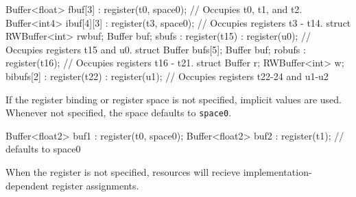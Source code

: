 \begin{HLSL}
  Buffer<float> fbuf[3] : register(t0, space0); // Occupies t0, t1, and t2.
  Buffer<int4> ibuf[4][3] : register(t3, space0); // Occupies registers t3 - t14.
  struct {RWBuffer<int> rwbuf; Buffer buf;} sbufs : register(t15) : register(u0); // Occupies registers t15 and u0.
  struct {Buffer bufs[5]; Buffer buf;} robufs : register(t16); // Occupies registers t16 - t21.
  struct {Buffer r; RWBuffer<int> w;} bibufs[2] : register(t22) : register(u1); // Occupies registers t22-24 and u1-u2
\end{HLSL}

If the register binding or register space is not specified, implicit values are used.
Whenever not specified, the space defaults to \texttt{space0}.

\begin{HLSL}
  Buffer<float2> buf1 : register(t0, space0);
  Buffer<float2> buf2 : register(t1); // defaults to space0
\end{HLSL}

When the register is not specified, resources will recieve implementation-dependent register assignments.
